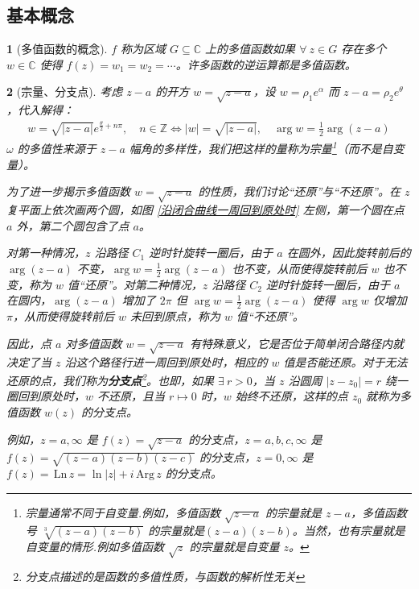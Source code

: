 \documentclass[UTF8]{report}
\def\Arg{\mathrm{\,Arg\,}}
\def\Ln{\mathrm{\,Ln\,}}
\def\Z{\mathbb{Z}}
\def\C{\mathbb{C}}
\theoremstyle{MyLineTheoremStyle} %
\theoremstyle{MyBlockTheoremStyle} %
\theoremstyle{MySubsubsectionStyle} %
\newtheorem{definition}{}
\begin{document}
\subsection{基本概念}

\begin{definition}[多值函数的概念]
$f$ 称为区域 $G \subseteq \C$ 上的多值函数如果 $\forall\ z \in G$ 存在多个 $w \in \C$ 使得 $f(z) = w_1 = w_2 = \cdots $。许多函数的逆运算都是多值函数。
\end{definition}

\begin{definition}[宗量、分支点]
考虑 $z-a$ 的开方 $w =\sqrt{z-a}$，设 $w = \rho_1 e^{\alpha}$ 而 $z-a = \rho_2e^{\theta}$，代入解得：
\begin{gather}
     w = \sqrt{| z-a |} e^{\frac{\theta}{2} + n\pi}, \quad n \in \Z \Longleftrightarrow 
     | w | = \sqrt{| z-a |},\quad \arg w = \frac{1}{2} \arg (z-a)
\end{gather}
$\omega $ 的多值性来源于 $z-a$ 幅角的多样性，我们把这样的量称为宗量\footnote{宗量通常不同于自变量.例如，多值函数 $\sqrt{z-a}$ 的宗量就是 $z-a$，多值函数号 $\sqrt[3]{(z - a)(z - b)}$ 的宗量就是$(z-a)(z-b)$。当然，也有宗量就是自变量的情形.例如多值函数 $\sqrt{z}$ 的宗量就是自变量 $z$。}（而不是自变量）。

为了进一步揭示多值函数 $w = \sqrt{z-a}$ 的性质，我们讨论“还原”与“不还原”。在 $z$ 复平面上依次画两个圆，如图 \ref{沿闭合曲线一周回到原处时} 左侧，第一个圆在点 $a$ 外，第二个圆包含了点 $a$。

对第一种情况，$z$ 沿路径 $C_1$ 逆时针旋转一圈后，由于 $a$ 在圆外，因此旋转前后的 $\arg (z-a)$ 不变，$\arg w = \frac{1}{2} \arg (z-a)$ 也不变，从而使得旋转前后 $w$ 也不变，称为 $w$ 值“还原”。对第二种情况，$z$ 沿路径 $C_2$ 逆时针旋转一圈后，由于 $a$ 在圆内，$\arg (z-a)$ 增加了 $2\pi$ 但 $\arg w = \frac{1}{2} \arg (z-a)$ 使得 $\arg w$ 仅增加 $\pi$，从而使得旋转前后 $w$ 未回到原点，称为 $w$ 值“不还原”。

因此，点 $a$ 对多值函数 $w =\sqrt{z-a}$ 有特殊意义，它是否位于简单闭合路径内就决定了当 $z$ 沿这个路径行进一周回到原处时，相应的 $w$ 值是否能还原。对于无法还原的点，我们称为\textbf{分支点}\footnote{分支点描述的是函数的多值性质，与函数的解析性无关}。也即，如果 $\exists\ r >0$，当 $z$ 沿圆周 $| z - z_0 | = r$ 绕一圈回到原处时，$w$ 不还原，且当 $r \mapsto 0$ 时，$w$ 始终不还原，这样的点 $z_0$ 就称为多值函数 $w(z)$ 的分支点。
{\par\color{gray}\small
例如，$z = a, \infty $ 是 $ f(z) = \sqrt{z - a} $ 的分支点，$z = a,b,c, \infty$ 是 $f(z) = \sqrt{(z-a)(z-b)(z-c)} $ 的分支点，$z = 0, \infty$ 是 $ f(z) = \Ln z = \ln | z | + i\Arg z$ 的分支点。
\par}
 



\end{definition}
\end{document}
